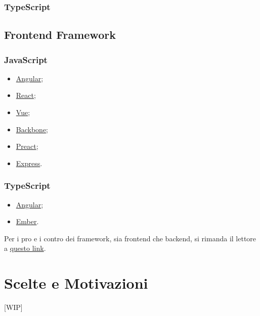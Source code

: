 \documentclass[a4paper, 12pt]{article}
\begin{document}
\subsubsection{TypeScript}

\subsection{Frontend Framework}
\subsubsection{JavaScript}
\begin{itemize}
    \item \href{https://angularjs.org/}{Angular};
    \item \href{https://react.dev/}{React};
    \item \href{https://vuejs.org/}{Vue};
    \item \href{https://backbonejs.org/}{Backbone};
    \item \href{https://preactjs.com/}{Preact};
    \item \href{https://expressjs.com/}{Express}.
\end{itemize}
\subsubsection{TypeScript}
\begin{itemize}
    \item \href{https://angularjs.org/}{Angular};
    \item \href{https://emberjs.com/}{Ember}.
\end{itemize}
Per i pro e i contro dei framework, sia frontend che backend, si rimanda il lettore a \href{https://blog.geekandjob.com/framework-javascript/}{questo link}.
\newpage
\section{Scelte e Motivazioni}
[WIP]
\end{document}
